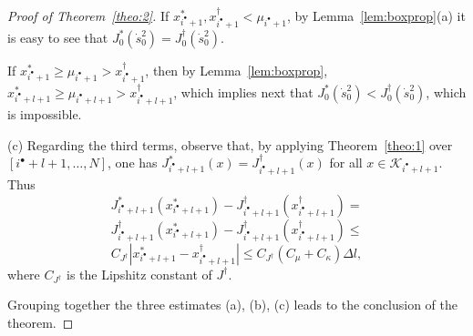 \documentclass[journal]{IEEEtran}
\theoremstyle{plain}
\theoremstyle{definition}
\theoremstyle{definition}
\begin{document}
\begin{proof}[Proof of Theorem~\ref{theo:2}]
  If
  $x^*_{i^{\bullet}+1}, x^\dagger_{i^{\bullet}+1} <
  \mu_{i^{\bullet}+1}$, by Lemma~\ref{lem:boxprop}(a) it is easy to
  see that $J_{0}^*(\dot s_{0}^{2}) = J_{0}^\dagger(\dot
  s_{0}^{2})$. 

  If $x^*_{i^{\bullet}+1} \geq \mu_{i^{\bullet}+1} >
  x^\dagger_{i^{\bullet}+1}$, then by Lemma~\ref{lem:boxprop},
  $x^*_{i^{\bullet}+l+1}\geq \mu_{i^{\bullet}+l+1} >
  x^\dagger_{i^{\bullet}+l+1}$, which implies next that
  $J_{0}^*(\dot s_{0}^{2}) < J_{0}^\dagger(\dot s_{0}^{2})$, which
  is impossible. 

  (c) Regarding the third terms, observe that, by applying
  Theorem~\ref{theo:1} over $[i^{\bullet}+l+1,\dots,N]$, one has
   $J^{*}_{i^{\bullet}+l+1}(x) = J^{\dagger}_{i^{\bullet}+l+1}(x)$ for
  all $x\in\mathcal{K}_{i^{\bullet}+l+1}$. Thus
  \[
  J^*_{i^\bullet+l+1}(x^*_{i^\bullet+l+1}) -
  J^\dagger_{i^\bullet+l+1}(x^\dagger_{i^\bullet+l+1}) = 
  \]
  \[
  J^\dagger_{i^\bullet+l+1}(x^*_{i^\bullet+l+1}) -
  J^\dagger_{i^\bullet+l+1}(x^\dagger_{i^\bullet+l+1}) \leq
  \]
  \[
  C_{J^\dagger} |x^*_{i^\bullet+l+1}-x^\dagger_{i^\bullet+l+1}| \leq
  C_{J^\dagger}(C_\mu+C_\kappa)\Delta l,
  \]
  where $C_{J^\dagger}$ is the Lipshitz constant of $J^\dagger$.
  
  Grouping together the three estimates (a), (b), (c) leads to the
  conclusion of the theorem.
\end{proof}
\end{document}
